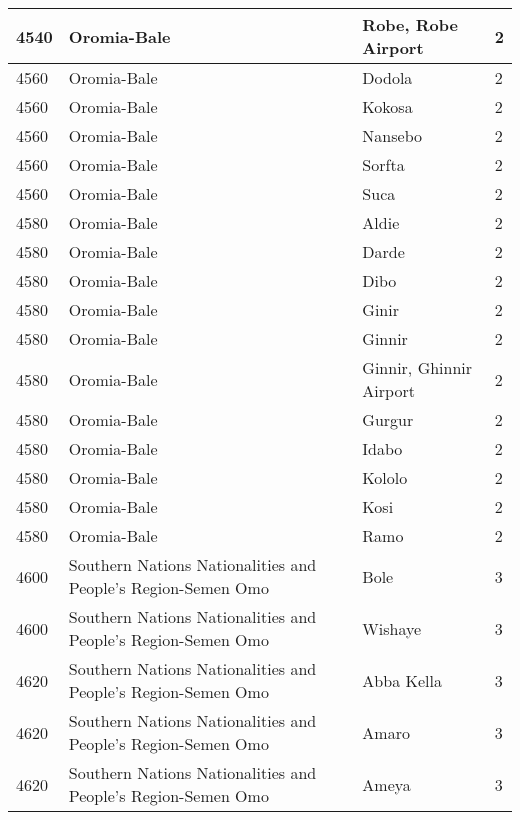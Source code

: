 \documentclass[12pt,a4paper,openbib,titlepage]{report}
\begin{document}
\begin{longtable}{|p{2cm}|p{6.5cm}|p{8cm}|p{1.5cm}|}
\rule[-1ex]{0pt}{2.5ex} 4540 & Oromia-Bale & Robe, Robe Airport & 2 \\ 
\hline 
\rule[-1ex]{0pt}{2.5ex} 4560 & Oromia-Bale & Dodola & 2 \\
\hline 
\rule[-1ex]{0pt}{2.5ex} 4560 & Oromia-Bale & Kokosa & 2 \\
\hline 
\rule[-1ex]{0pt}{2.5ex} 4560 & Oromia-Bale & Nansebo & 2 \\
\hline 
\rule[-1ex]{0pt}{2.5ex} 4560 & Oromia-Bale & Sorfta & 2 \\
\hline 
\rule[-1ex]{0pt}{2.5ex} 4560 & Oromia-Bale & Suca & 2 \\
\hline 
\rule[-1ex]{0pt}{2.5ex} 4580 & Oromia-Bale & Aldie & 2 \\
\hline 
\rule[-1ex]{0pt}{2.5ex} 4580 & Oromia-Bale & Darde & 2 \\
\hline 
\rule[-1ex]{0pt}{2.5ex} 4580 & Oromia-Bale & Dibo & 2 \\
\hline 
\rule[-1ex]{0pt}{2.5ex} 4580 & Oromia-Bale & Ginir & 2 \\
\hline 
\rule[-1ex]{0pt}{2.5ex} 4580 & Oromia-Bale & Ginnir & 2 \\
\hline 
\rule[-1ex]{0pt}{2.5ex} 4580 & Oromia-Bale & Ginnir, Ghinnir Airport & 2 \\
\hline 
\rule[-1ex]{0pt}{2.5ex} 4580 & Oromia-Bale & Gurgur & 2 \\
\hline 
\rule[-1ex]{0pt}{2.5ex} 4580 & Oromia-Bale & Idabo & 2 \\
\hline 
\rule[-1ex]{0pt}{2.5ex} 4580 & Oromia-Bale & Kololo & 2 \\
\hline 
\rule[-1ex]{0pt}{2.5ex} 4580 & Oromia-Bale & Kosi & 2 \\
\hline 
\rule[-1ex]{0pt}{2.5ex} 4580 & Oromia-Bale & Ramo & 2 \\
\hline 
\rule[-1ex]{0pt}{2.5ex} 4600 & Southern Nations Nationalities and People's Region-Semen Omo & Bole & 3 \\
\hline 
\rule[-1ex]{0pt}{2.5ex} 4600 & Southern Nations Nationalities and People's Region-Semen Omo & Wishaye & 3 \\
\hline 
\rule[-1ex]{0pt}{2.5ex} 4620 & Southern Nations Nationalities and People's Region-Semen Omo & Abba Kella & 3 \\
\hline 
\rule[-1ex]{0pt}{2.5ex} 4620 & Southern Nations Nationalities and People's Region-Semen Omo & Amaro & 3 \\
\hline 
\rule[-1ex]{0pt}{2.5ex} 4620 & Southern Nations Nationalities and People's Region-Semen Omo & Ameya & 3 \\

\end{longtable}
\end{document}
